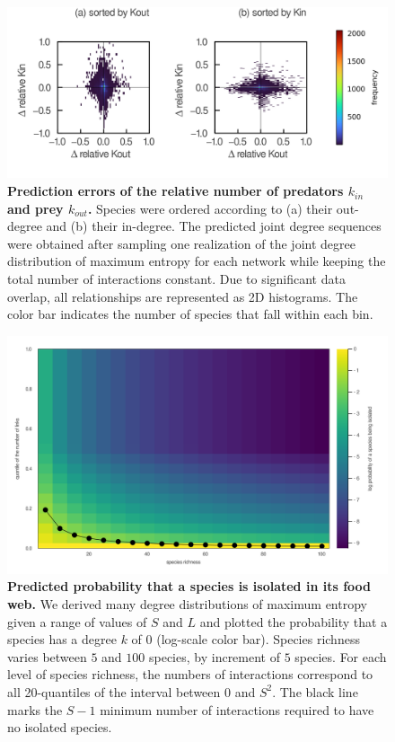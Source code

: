 \begin{figure}[h]
    \centering
    \includegraphics[width=\textwidth]{figures/S_article2/kin_kout_difference.png}
    \caption{\textbf{Prediction errors of the relative number of predators $k_{in}$ and prey
    $k_{out}$.} Species were ordered according to (a) their out-degree and (b)
    their in-degree. The predicted joint degree sequences were obtained after
    sampling one realization of the joint degree distribution of maximum entropy for
    each network while keeping the total number of interactions constant. Due to
    significant data overlap, all relationships are represented as 2D histograms.
    The color bar indicates the number of species that fall within each
    bin.}
    \label{fig:kin_kout_diff}
\end{figure}

\begin{figure}[h]
    \centering
    \includegraphics[width=\textwidth]{figures/S_article2/heatmap_disconnected.png}
    \caption{\textbf{Predicted probability that a species is isolated in its food web.} We
    derived many degree distributions of maximum entropy given a range of values of
    $S$ and $L$ and plotted the probability that a species has a degree $k$ of $0$
    (log-scale color bar). Species richness varies between $5$ and $100$ species, by
    increment of $5$ species. For each level of species richness, the numbers of
    interactions correspond to all 20-quantiles of the interval between $0$ and
    $S^2$. The black line marks the $S-1$ minimum number of interactions required to
    have no isolated species.}
    \label{fig:heatmap}
\end{figure}

